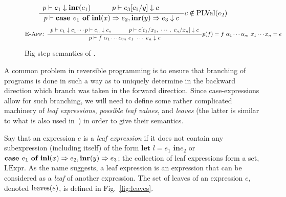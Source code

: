 \begin{figure}[ht]
\begin{align*}
    \dfrac
      {\begin{array}{ccccc}
       \pcon e_1 \downarrow \inr{c_1} & \quad &
       \pcon e_3 [c_1 / y] \downarrow c & \quad &
       \end{array}}
      {\pcon \caseof{e_1}{\inl{x}}{e_2}{\inr{y}}{e_3} \downarrow c}c \notin
      \PLVal(e_2)%
\end{align*}
\alignspace
\begin{align*}
  \textsc{E-App: }
    \dfrac
      {\begin{array}{ccc}
       p \vdash e_1 \downarrow c_1 \cdots p \vdash e_n \downarrow c_n & \quad &
       p \vdash e[c_1 / x_1,\ \cdots,\ c_n / x_n] \downarrow c
       \end{array}}
      {p \vdash f\ \alpha_1 \cdots \alpha_m~e_1\ \cdots\ e_n \downarrow c}
      p(f) = f\ \alpha_1 \cdots \alpha_m ~ x_1 \cdots x_n = e
\end{align*}
\caption{Big step semantics of \rfunc.}\label{math:semantics}
\end{figure}

A common problem in reversible programming is to ensure that branching of
programs is done in such a way as to uniquely determine in the backward
direction which branch was taken in the forward direction. Since
case-expressions allow for such branching, we will need to define some rather
complicated machinery of \emph{leaf expressions}, \emph{possible leaf values},
and \emph{leaves} (the latter is similar to what is also used
in~\cite{YokoyamaAxelsenGlueck:2012:LNCS}) in order to give their semantics.

Say that an expression $e$ is a \emph{leaf expression} if it does not contain
any subexpression (including itself) of the form $\textbf{let $l = e_1$ in
$e_2$}$ or $\textbf{case } e_1 \textbf{ of } \textbf{inl}(x) \Rightarrow e_2, \textbf{inr}(y) \Rightarrow e_3$; the collection of leaf
expressions form a set, $\text{LExpr}$. As the name suggests, a leaf expression
is an expression that can be considered as a \emph{leaf} of another expression.
The set of leaves of an expression $e$, denoted $\text{leaves}(e)$, is defined in
Fig.~\ref{fig:leaves}.

